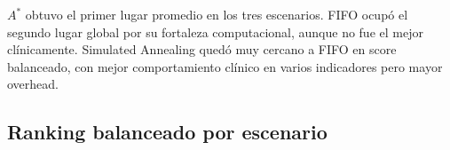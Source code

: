 \documentclass[12pt,a4paper]{article}
\begin{document}
\begin{table}[H]
\centering
\begin{small}
%
\end{small}
\caption{Ranking global balanceado por algoritmo.}
\label{tab:ranking-global}
\end{table}

$A^*$ obtuvo el primer lugar promedio en los tres escenarios. FIFO ocupó el segundo lugar global por su fortaleza computacional, aunque no fue el mejor clínicamente. Simulated Annealing quedó muy cercano a FIFO en score balanceado, con mejor comportamiento clínico en varios indicadores pero mayor overhead.

\subsection{Ranking balanceado por escenario}
\end{document}
